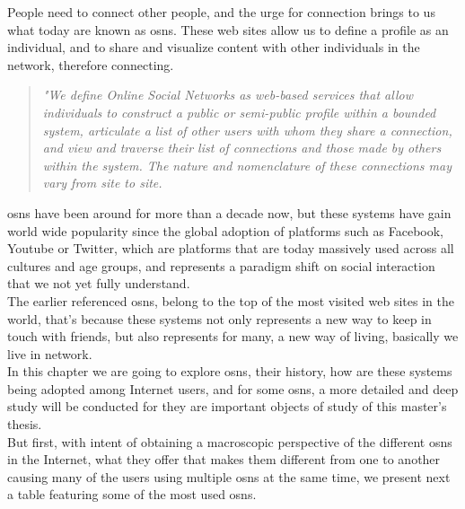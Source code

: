 
People need to connect other people, and the urge for connection brings to us what today are known as \glspl{osn}.
These web sites allow us to define a profile as an individual, and to share and visualize content with other individuals in the network, therefore connecting.

\begin{quote}
\textit{"We define Online Social Networks as web-based services that allow individuals to construct a public or semi-public
 profile within a bounded system, articulate a list of other users with whom they share a connection, and view and traverse
 their list of connections and those made by others within the system. The nature and nomenclature of these connections
 may vary from site to site.} \cite{ellison2007social}
\end{quote}

\indent \glspl{osn} have been around for more than a decade now, but these systems have gain world wide popularity since the global adoption of
platforms such as Facebook, Youtube or Twitter, which are platforms that are today massively used across all cultures and age groups, and represents
a paradigm shift on social interaction that we not yet fully understand.\\
\indent The earlier referenced \glspl{osn}, belong to the top of the most visited web sites in the world, that's because these systems not only represents a new
way to keep in touch with friends, but also represents for many, a new way of living, basically we live in network.\\
\indent In this chapter we are going to explore \glspl{osn}, their history, how are these systems being adopted among Internet users, and for some \glspl{osn},
a more detailed and deep study will be conducted for they are important objects of study of this master's thesis.\\
\indent But first, with intent of obtaining a macroscopic perspective of the different \glspl{osn} in the Internet, what they offer
that makes them different from one to another causing many of the users using multiple \glspl{osn} at the same time, we present next a table featuring some
of the most used \glspl{osn}.

